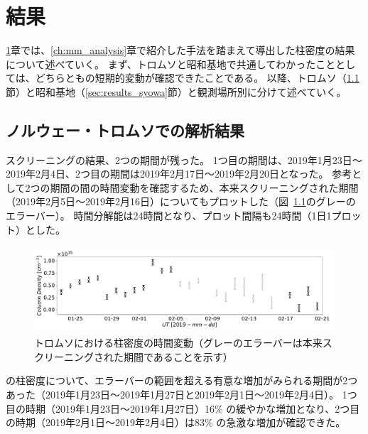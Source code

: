 \chapter{結果}
\label{ch:results}
\ref{ch:results}章では、\ref{ch:mm_analysis}章で紹介した手法を踏まえて導出した柱密度の結果について述べていく。
まず、トロムソと昭和基地で共通してわかったこととしては、どちらともの短期的変動が確認できたことである。
以降、トロムソ（\ref{sec:results_tromsoe}節）と昭和基地（\ref{sec:results_syowa}節）と観測場所別に分けて述べていく。

\section{ノルウェー・トロムソでの解析結果}
\label{sec:results_tromsoe}
スクリーニングの結果、2つの期間が残った。
1つ目の期間は、2019年1月23日〜2019年2月4日、2つ目の期間は2019年2月17日〜2019年2月20日となった。
参考として2つの期間の間の時間変動を確認するため、本来スクリーニングされた期間（2019年2月5日〜2019年2月16日）についてもプロットした（図~\ref{fig:avg_ColumnDensity_tromsoe}のグレーのエラーバー）。
時間分解能は24時間となり、プロット間隔も24時間（1日1プロット）とした。
\begin{figure}[htbp]
    \centering
    \includegraphics[width=\linewidth]{master_thesis_contents/master_thesis_fig/avg_ColumnDensity_tromsoe.pdf}
    \caption{トロムソにおける柱密度の時間変動（グレーのエラーバーは本来スクリーニングされた期間であることを示す）}
    \label{fig:avg_ColumnDensity_tromsoe}
\end{figure}
の柱密度について、エラーバーの範囲を超える有意な増加がみられる期間が2つあった（2019年1月23日〜2019年1月27日と2019年2月1日〜2019年2月4日）。
1つ目の時期（2019年1月23日〜2019年1月27日）16\% の緩やかな増加となり、2つ目の時期（2019年2月1日〜2019年2月4日）は83\% の急激な増加が確認できた。


